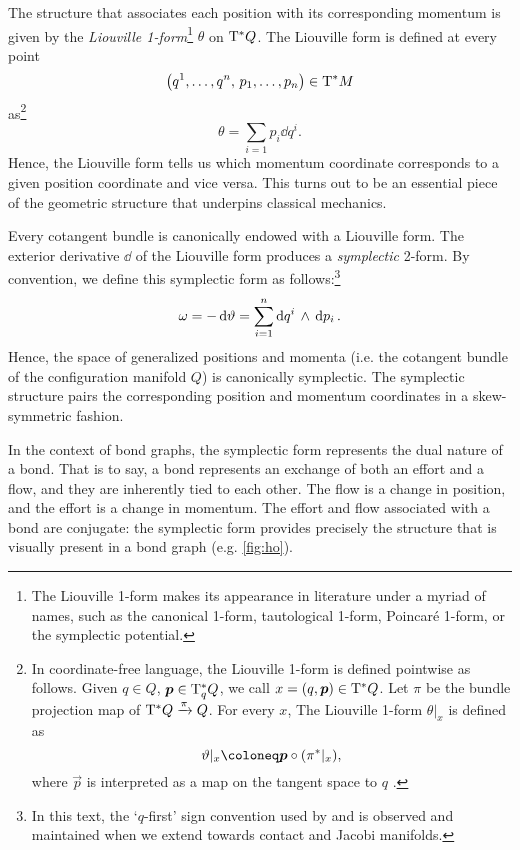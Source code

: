 The structure that associates each position with its corresponding momentum is given by the \emph{Liouville 1-form}\footnote
{
    The Liouville 1-form makes its appearance in literature under a myriad of names, such as the canonical 1-form, tautological 1-form, Poincaré 1-form, or the symplectic potential.
}
\(\theta\) on \(\mathrm{T}^*Q\). The Liouville form is defined at every point 
\[ \qty(q^1, \ldots, q^n,\, p_1, \ldots, p_n) \in \mathrm{T}^*M \] 
as\footnote
{
    In coordinate-free language, the Liouville 1-form is defined pointwise as follows. Given $q \in Q$, $\vec{p} \in \ctspace{q}{Q}$, we call $x = (q, \vec{p}) \in \ctbundle{Q}$. Let $\pi$ be the bundle projection map of $\mathrm{T}^*Q\xrightarrow[]{\pi}Q$. For every $x$, The Liouville 1-form $\theta\vert_x$ is defined as
    \begin{equation}
        \theta\vert_x \coloneq \vec{p} \circ \qty(\pi^*\vert_x),
    \end{equation}
    where $\vec{p}$ is interpreted as a map on the tangent space to $q$ \cite{Cannas2001}.
}
\begin{equation}
    \theta = \sum_{i = 1} p_i\dd{q^i}.
\end{equation}
Hence, the Liouville form tells us which momentum coordinate corresponds to a given position coordinate and vice versa. This turns out to be an essential piece of the geometric structure that underpins classical mechanics.

Every cotangent bundle is canonically endowed with a Liouville form. The exterior derivative $\dd{}$ of the Liouville form produces a \emph{symplectic} 2-form. By convention, we define this symplectic form as follows:\footnote
{
    In this text, the `\(q\)-first' sign convention used by \citet{Abraham1978} and \citet{Cannas2001} is observed and maintained when we extend towards contact and Jacobi manifolds.
}
\begin{equation}
     \omega = -\dd{\vartheta} = \sum_{i = 1}^n  \dd{q^i}\,\wedge\,\dd{p_i} .
\end{equation}
Hence, the space of generalized positions and momenta (i.e. the cotangent bundle of the configuration manifold \(Q\)) is canonically symplectic. The symplectic structure pairs the corresponding position and momentum coordinates in a skew-symmetric fashion.

In the context of bond graphs, the symplectic form represents the dual nature of a bond. That is to say, a bond represents an exchange of both an effort and a flow, and they are inherently tied to each other. The flow is a change in position, and the effort is a change in momentum. The effort and flow associated with a bond are conjugate: the symplectic form provides precisely the structure that is visually present in a bond graph (e.g. \cref{fig:ho}).

